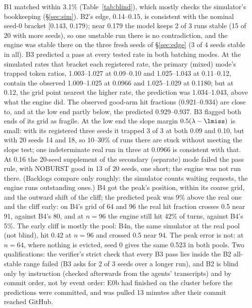 B1 matched within 3.1\% (Table~\ref{tab:blind}), which mostly checks the simulator's bookkeeping (\S\ref{sec:sim}). B2's edge, 0.14--0.15\sps, is consistent with the nominal seed-0 bracket $[0.143,\,0.179)$; near 0.179 the model keeps 2 of 3 runs stable (15 of 20 with more seeds), so one unstable run there is no contradiction, and the engine was stable there on the three fresh seeds of \S\ref{sec:edge} (3 of 4 seeds stable in all). B3 predicted a pass at every tested rate in both batching modes. At the simulated rates that bracket each registered rate, the primary (mixed) mode's trapped token ratios, 1.003--1.027 at 0.09--0.10\sps{} and 1.025--1.043 at 0.11--0.12, contain the observed 1.009--1.025 at 0.0966 and 1.025--1.029 at 0.1180; but at 0.12, the grid point nearest the higher rate, the prediction was 1.034--1.043, above what the engine did. The observed good-arm hit fractions (0.921--0.934) are close to, and at the low end partly below, the predicted 0.929--0.937. B3 flagged both ends of its grid as fragile. At the low end the slope margin $0.5(\lambda-\lmiss)$ is small: with its registered three seeds it trapped 3 of 3 at both 0.09 and 0.10, but with 20 seeds 14 and 18, so 10--30\% of runs there are stuck without meeting the slope test; one indeterminate real run in three at 0.0966 is consistent with that. At 0.16 the 20-seed supplement of the secondary (separate) mode failed the pass rule, with NOBURST good in 13 of 20 seeds, one short; the engine was not run there. (Backlogs compare only roughly: the simulator counts waiting requests, the engine runs outstanding ones.) B4 got the peak's position, within its coarse grid, and the outward shift of the cliff; the predicted peak was 9\% above the real one and the cliff early: on B4's grid of 64 and 96 the real hit fraction crosses 0.5 near 91, against B4's 80, and at $n=96$ the engine still hit 42\% of turns, against B4's 5\%. The early cliff is mostly the pool: B4n, the same simulator at the real pool (not blind), hit 0.42 at $n=96$ and crossed 0.5 near 94. The peak error is not: at $n=64$, where nothing is evicted, seed 0 gives the same 0.523 in both pools. Two qualifications: the verifier's strict check that every B3 pass lies inside the B2 all-stable range failed (B3 asks for 2 of 3 seeds over a longer run), and B2 is blind only by instruction (checked afterwards from the agents' transcripts) and by commit order, not by event order: E0b had finished on the cluster before the predictions were committed, and was pulled 13 minutes after their commit reached GitHub.

